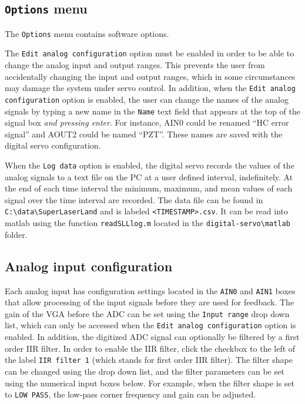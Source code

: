 \documentclass[aip,rsi,preprint,graphicx]{revtex4-1}
\begin{document}
\subsection{{\tt Options} menu}

The {\tt Options} menu contains software options.

The {\tt Edit analog configuration} option must be enabled in order to be able to change the analog input and output ranges.  This prevents the user from accidentally changing the input and output ranges, which in some circumstances may damage the system under servo control.  In addition, when the {\tt Edit analog configuration} option is enabled, the user can change the names of the analog signals by typing a new name in the {\tt Name} text field that appears at the top of the signal box {\it and pressing enter}.  For instance, AIN0 could be renamed ``HC error signal'' and AOUT2 could be named ``PZT''.  These names are saved with the digital servo configuration.

When the {\tt Log data} option is enabled, the digital servo records the values of the analog signals to a text file on the PC at a user defined interval, indefinitely.  At the end of each time interval the minimum, maximum, and mean values of each signal over the time interval are recorded.  The data file can be found in {\tt C:\textbackslash data\textbackslash SuperLaserLand} and is labeled {\tt <TIMESTAMP>.csv}.  It can be read into matlab using the function {\tt readSLLlog.m} located in the {\tt digital-servo\textbackslash matlab} folder.

\subsection{Analog input configuration}

Each analog input has configuration settings located in the {\tt AIN0} and {\tt AIN1} boxes that allow processing of the input signals before they are used for feedback.  The gain of the VGA before the ADC can be set using the {\tt Input range} drop down list, which can only be accessed when the {\tt Edit analog configuration} option is enabled.  In addition, the digitized ADC signal can optionally be filtered by a first order IIR filter.  In order to enable the IIR filter, click the checkbox to the left of the label {\tt IIR filter 1} (which stands for first order IIR filter).  The filter shape can be changed using the drop down list, and the filter parameters can be set using the numerical input boxes below.  For example, when the filter shape is set to {\tt LOW PASS}, the low-pass corner frequency and gain can be adjusted.
\end{document}
